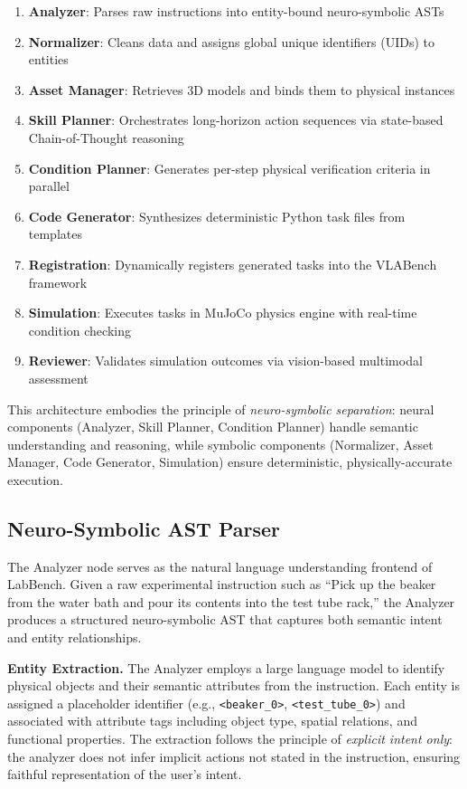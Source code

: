 \documentclass[letterpaper]{article} %
\begin{document}
\begin{enumerate}
    \item \textbf{Analyzer}: Parses raw instructions into entity-bound neuro-symbolic ASTs
    \item \textbf{Normalizer}: Cleans data and assigns global unique identifiers (UIDs) to entities
    \item \textbf{Asset Manager}: Retrieves 3D models and binds them to physical instances
    \item \textbf{Skill Planner}: Orchestrates long-horizon action sequences via state-based Chain-of-Thought reasoning
    \item \textbf{Condition Planner}: Generates per-step physical verification criteria in parallel
    \item \textbf{Code Generator}: Synthesizes deterministic Python task files from templates
    \item \textbf{Registration}: Dynamically registers generated tasks into the VLABench framework
    \item \textbf{Simulation}: Executes tasks in MuJoCo physics engine with real-time condition checking
    \item \textbf{Reviewer}: Validates simulation outcomes via vision-based multimodal assessment
\end{enumerate}

This architecture embodies the principle of \textit{neuro-symbolic separation}: neural components (Analyzer, Skill Planner, Condition Planner) handle semantic understanding and reasoning, while symbolic components (Normalizer, Asset Manager, Code Generator, Simulation) ensure deterministic, physically-accurate execution.

\subsection{Neuro-Symbolic AST Parser}

The Analyzer node serves as the natural language understanding frontend of LabBench. Given a raw experimental instruction such as ``Pick up the beaker from the water bath and pour its contents into the test tube rack,'' the Analyzer produces a structured neuro-symbolic AST that captures both semantic intent and entity relationships.

\textbf{Entity Extraction.} The Analyzer employs a large language model to identify physical objects and their semantic attributes from the instruction. Each entity is assigned a placeholder identifier (e.g., \texttt{<beaker\_0>}, \texttt{<test\_tube\_0>}) and associated with attribute tags including object type, spatial relations, and functional properties. The extraction follows the principle of \textit{explicit intent only}: the analyzer does not infer implicit actions not stated in the instruction, ensuring faithful representation of the user's intent.
\end{document}
